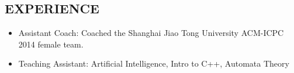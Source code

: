 \documentclass[margin, 10pt]{res} %
\begin{document}
\begin{resume}
\section{EXPERIENCE}
\begin{itemize}
\item Assistant Coach: Coached the Shanghai Jiao Tong University ACM-ICPC 2014 female team.
\item Teaching Assistant: Artificial Intelligence, Intro to C++, Automata Theory
\end{itemize}


 
\end{resume}
\end{document}
